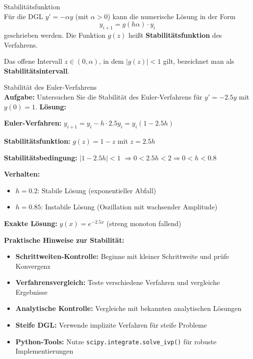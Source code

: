 \begin{definition}{Stabilitätsfunktion}\\
Für die DGL $y' = -\alpha y$ (mit $\alpha > 0$) kann die numerische Lösung in der Form
$$y_{i+1} = g(h\alpha) \cdot y_i$$
geschrieben werden. Die Funktion $g(z)$ heißt \textbf{Stabilitätsfunktion} des Verfahrens.

Das offene Intervall $z \in (0, \alpha)$, in dem $|g(z)| < 1$ gilt, bezeichnet man als \textbf{Stabilitätsintervall}.
\end{definition}

\begin{example2}{Stabilität des Euler-Verfahrens}\\
\textbf{Aufgabe:} Untersuchen Sie die Stabilität des Euler-Verfahrens für $y' = -2.5y$ mit $y(0) = 1$.
\tcblower
\textbf{Lösung:}

\textbf{Euler-Verfahren:} $y_{i+1} = y_i - h \cdot 2.5 y_i = y_i(1 - 2.5h)$

\textbf{Stabilitätsfunktion:} $g(z) = 1 - z$ mit $z = 2.5h$

\textbf{Stabilitätsbedingung:} $|1 - 2.5h| < 1$
$\Rightarrow 0 < 2.5h < 2 \Rightarrow 0 < h < 0.8$

\textbf{Verhalten:}
\begin{itemize}
    \item $h = 0.2$: Stabile Lösung (exponentieller Abfall)
    \item $h = 0.85$: Instabile Lösung (Oszillation mit wachsender Amplitude)
\end{itemize}

\textbf{Exakte Lösung:} $y(x) = e^{-2.5x}$ (streng monoton fallend)
\end{example2}

\begin{remark}
\textbf{Praktische Hinweise zur Stabilität:}
\begin{itemize}
    \item \textbf{Schrittweiten-Kontrolle:} Beginne mit kleiner Schrittweite und prüfe Konvergenz
    \item \textbf{Verfahrensvergleich:} Teste verschiedene Verfahren und vergleiche Ergebnisse
    \item \textbf{Analytische Kontrolle:} Vergleiche mit bekannten analytischen Lösungen
    \item \textbf{Steife DGL:} Verwende implizite Verfahren für steife Probleme
    \item \textbf{Python-Tools:} Nutze \texttt{scipy.integrate.solve\_ivp()} für robuste Implementierungen
\end{itemize}
\end{remark}

